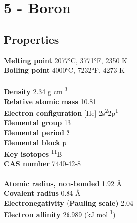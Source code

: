 \section{5 - Boron}
\label{sec:elem-boron}
\subsection{Properties}
\textbf{Melting point} 2077°C, 3771°F, 2350 K\\
\textbf{Boiling point} 4000°C, 7232°F, 4273 K\\
\\
\textbf{Density} 2.34 g cm\textsuperscript{-3}\\
\textbf{Relative atomic mass} 10.81\\
\textbf{Electron configuration} [He] 2s\textsuperscript{2}2p\textsuperscript{1} \\
\textbf{Elemental group} 13\\
\textbf{Elemental period} 2\\
\textbf{Elemental block} p\\
\textbf{Key isotopes} \textsuperscript{11}B\\
\textbf{CAS number} 7440-42-8\\
\\
\textbf{Atomic radius, non-bonded} 1.92 Å\\
\textbf{Covalent radius} 0.84 Å\\
\textbf{Electronegativity (Pauling scale)} 2.04\\
\textbf{Electron affinity} 26.989 (kJ mol\textsuperscript{-1})\\